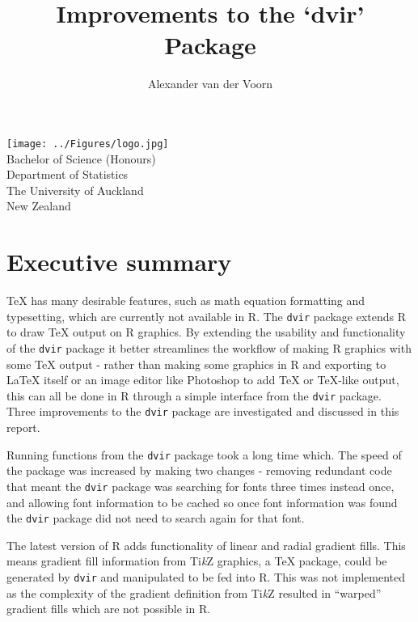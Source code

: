 \documentclass[]{article}
\title{Improvements to the `dvir' Package}
\author{Alexander van der Voorn}
\date{}
\begin{document}
\maketitle

\newcommand*\Tikz{\textup{Ti\textit kZ}}

\begin{center}

\vspace{8cm}
\texttt{[image: ../Figures/logo.jpg]}\\
\vspace{1cm}
Bachelor of Science (Honours)\\
Department of Statistics\\
The University of Auckland\\
New Zealand

\end{center}

\newpage

\tableofcontents

\newpage{}

\section{Executive summary}\label{executive-summary}

\TeX{} has many desirable features, such as math equation formatting and
typesetting, which are currently not available in R. The \texttt{dvir}
package extends R to draw \TeX{} output on R graphics. By extending the
usability and functionality of the \texttt{dvir} package it better
streamlines the workflow of making R graphics with some \TeX{} output -
rather than making some graphics in R and exporting to \LaTeX{} itself
or an image editor like Photoshop to add \TeX{} or \TeX{}-like output,
this can all be done in R through a simple interface from the
\texttt{dvir} package. Three improvements to the \texttt{dvir} package
are investigated and discussed in this report.

Running functions from the \texttt{dvir} package took a long time which.
The speed of the package was increased by making two changes - removing
redundant code that meant the \texttt{dvir} package was searching for
fonts three times instead once, and allowing font information to be
cached so once font information was found the \texttt{dvir} package did
not need to search again for that font.

The latest version of R adds functionality of linear and radial gradient
fills. This means gradient fill information from \Tikz{} graphics, a
\TeX{} package, could be generated by \texttt{dvir} and manipulated to
be fed into R. This was not implemented as the complexity of the
gradient definition from \Tikz{} resulted in ``warped'' gradient fills
which are not possible in R.
\end{document}
